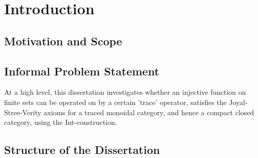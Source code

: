 \chapter{Introduction}
\section{Motivation and Scope}

\section{Informal Problem Statement}
At a high level, this dissertation investigates whether an injective function
on finite sets can be operated on by a certain 'trace' operator, satisfies the
Joyal-Stree-Verity axioms for a traced monoidal category, and hence a compact
closed category, using the Int-construction.

\section{Structure of the Dissertation}
